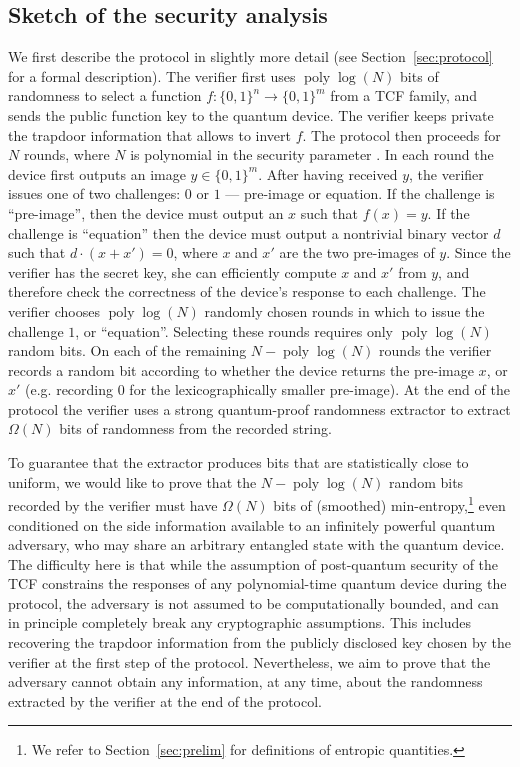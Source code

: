 \documentclass[11pt]{article}
\theoremstyle{remark}
\theoremstyle{definition}
\DeclareMathOperator{\poly}{poly}
\begin{document}
\subsection{Sketch of the security analysis}
\label{sec:proofsketch}

We first describe the protocol in slightly more detail (see Section~\ref{sec:protocol} for a formal description). The verifier first uses $\poly\log(N)$ \znote{Change $\poly\log(N)$ to some parameter, e.g.\ $r$, or explicitly write $\poly(\lambda)$.} bits of randomness to 
select a function $f:\{0,1\}^n \rightarrow \{0,1\}^m$ from a TCF family, and sends the public function key to the quantum device. The verifier keeps private the trapdoor information that allows to invert $f$.
The protocol then proceeds for $N$ rounds, where $N$ is polynomial in the security parameter . In each round the device first outputs an image $y \in \{0,1\}^m$. After having received $y$, the verifier issues one of two 
challenges: $0$ or $1$ --- pre-image or equation. If the challenge is ``pre-image'', then the device must output an $x$ such that $f(x) = y$. If the challenge is 
``equation'' then the device must output a nontrivial binary vector $d$ such that $d\cdot(x + x') = 0$, where $x$ and $x'$ are the two pre-images of $y$. Since the verifier has the secret key, she can efficiently compute $x$ and $x'$ from $y$, and therefore check the correctness of the
device's response to each challenge. The verifier chooses 
$\poly\log(N)$ randomly chosen rounds in which to issue the challenge $1$, or ``equation''. Selecting these rounds requires only
$\poly\log(N)$ random bits. On each of the remaining $N - \poly\log(N)$ rounds the verifier records a random bit according to 
whether the device returns the pre-image $x$, or $x'$ (e.g. recording $0$ for the lexicographically smaller pre-image). At the end of the protocol the verifier
uses a strong quantum-proof randomness extractor to extract $\Omega(N)$ bits of randomness from the recorded string. 

To guarantee that the extractor produces bits that are statistically close to uniform, we would like to prove that the $N - \poly\log(N)$ random bits recorded by the verifier must have  $\Omega(N)$ bits of (smoothed) min-entropy,\footnote{We refer to Section~\ref{sec:prelim} for definitions of entropic quantities.} even conditioned on the side information available to an infinitely powerful quantum adversary, who may share an arbitrary entangled state with
the quantum device. The difficulty here is that while the assumption of  post-quantum security of the TCF constrains the responses of any polynomial-time quantum device during the
protocol, the adversary is not assumed to be computationally bounded, and can in principle completely break any cryptographic assumptions. This includes recovering the trapdoor information from the publicly disclosed key chosen by the verifier at the first step of the protocol. Nevertheless, we aim to prove that the adversary cannot obtain any information, at any time, about the randomness extracted by the verifier at the end of the protocol. 
\end{document}

